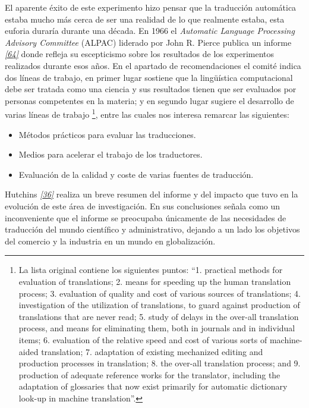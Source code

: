 \documentclass[a4paper,12pt,spanish]{book}
\begin{document}
El aparente éxito de este experimento hizo pensar que la traducción automática estaba
mucho más cerca de ser una realidad de lo que realmente estaba, esta euforia duraría
durante una década. En 1966 el \emph{Automatic Language Processing Advisory Committee} (ALPAC)
liderado por John R. Pierce publica un informe \label{0.intro:id15}{\hyperref[zreferences:pierce1966]{\emph{{[}64{]}}}} donde refleja su
escepticismo sobre los resultados de los experimentos realizados durante esos años.
En el apartado de recomendaciones el comité indica dos líneas de trabajo, en primer lugar
sostiene que la lingüística computacional debe ser tratada como una ciencia y sus
resultados tienen que ser evaluados por personas competentes en la materia; y en
segundo lugar sugiere el desarrollo de varias líneas de trabajo \footnote{
La lista original contiene los siguientes puntos: ``1. practical methods
for evaluation of translations; 2. means for speeding up the human translation
process; 3. evaluation of quality and cost of various sources of translations;
4. investigation of the utilization of translations, to guard against production
of translations that are never read; 5. study of delays in the over-all
translation process, and means for eliminating them, both in journals and in
individual items; 6. evaluation of the relative speed and cost of various sorts
of machine-aided translation; 7. adaptation of existing mechanized editing and
production processes in translation; 8. the over-all translation process; and
9. production of adequate reference works for the translator, including the
adaptation of glossaries that now exist primarily for automatic dictionary look-up
in machine translation''.
}, entre las
cuales nos interesa remarcar las siguientes:
\begin{itemize}
\item {} 
Métodos prácticos para evaluar las traducciones.

\item {} 
Medios para acelerar el trabajo de los traductores.

\item {} 
Evaluación de la calidad y coste de varias fuentes de traducción.

\end{itemize}

Hutchins \label{0.intro:id18}{\hyperref[zreferences:hutchins2003]{\emph{{[}36{]}}}} realiza un breve resumen del informe y del impacto
que tuvo en la evolución de este área de investigación. En sus conclusiones señala
como un inconveniente que el informe se preocupaba únicamente de las necesidades
de traducción del mundo científico y administrativo, dejando a un lado los objetivos
del comercio y la industria en un mundo en globalización.
\end{document}

